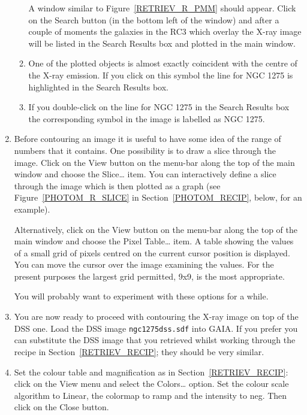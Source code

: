 \documentclass[twoside,11pt]{article}
\renewcommand{\_}{\texttt{\symbol{95}}}
\begin{document}
\begin{enumerate}
\begin{enumerate}
     A window similar to Figure~\ref{RETRIEV_R_PMM} should appear.  Click
     on the {\sf Search} button (in the bottom left of the window) and
     after a couple of moments the galaxies in the RC3 which overlay the
     X-ray image will be listed in the {\sf Search Results} box and plotted
     in the main window.

    \item One of the plotted objects is almost exactly coincident with the
     centre of the X-ray emission.  If you click on this symbol the line
     for NGC 1275 is highlighted in the {\sf Search Results} box.

    \item If you double-click on the line for NGC 1275 in the {\sf Search
     Results} box the corresponding symbol in the image is labelled as
     NGC 1275.

  \end{enumerate}

  \item Before contouring an image it is useful to have some idea of the
   range of numbers that it contains.  One possibility is to draw a slice
   through the image.  Click on the {\sf View} button on the menu-bar
   along the top of the main window and choose the {\sf Slice\ldots} item.
   You can interactively define a slice through the image which is then
   plotted as a graph (see Figure~\ref{PHOTOM_R_SLICE} in
   Section~\ref{PHOTOM_RECIP}, below, for an example).

   Alternatively, click on the {\sf View} button on the menu-bar
   along the top of the main window and choose the {\sf Pixel Table\ldots}
   item.  A table showing the values of a small grid of pixels centred on
   the current  cursor position is displayed.  You can move the cursor over
   the image examining the values.  For the present purposes the largest
   grid permitted, {\sf 9x9}, is the most appropriate.

   You will probably want to experiment with these options for a while.

  \item You are now ready to proceed with contouring the X-ray image on top
   of the DSS one.  Load the DSS image {\tt ngc1275dss.sdf} into GAIA.  If
   you prefer you can substitute the DSS image that you retrieved whilst
   working through the recipe in Section~\ref{RETRIEV_RECIP}; they should
   be very similar.

  \item Set the colour table and magnification as in
   Section~\ref{RETRIEV_RECIP}: click on the {\sf View} menu and select
   the {\sf Colors\ldots} option.  Set the colour scale algorithm to {\sf
   Linear}, the colormap to {\sf ramp} and the intensity to {\sf neg}.
   Then click on the {\sf Close} button.


\end{enumerate}
\end{document}

